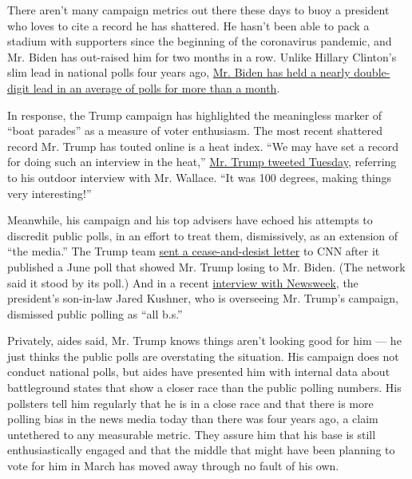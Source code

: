 There aren't many campaign metrics out there these days to buoy a
president who loves to cite a record he has shattered. He hasn't been
able to pack a stadium with supporters since the beginning of the
coronavirus pandemic, and Mr. Biden has out-raised him for two months in
a row. Unlike Hillary Clinton's slim lead in national polls four years
ago,
\href{https://www.nytimes.com/2020/07/20/upshot/biden-trump-poll.html?smid=tw-share}{Mr.
Biden has held a nearly double-digit lead in an average of polls for
more than a month}.

In response, the Trump campaign has highlighted the meaningless marker
of ``boat parades'' as a measure of voter enthusiasm. The most recent
shattered record Mr. Trump has touted online is a heat index. ``We may
have set a record for doing such an interview in the heat,''
\href{https://twitter.com/realDonaldTrump/status/1285520211593105413}{Mr.
Trump tweeted Tuesday}, referring to his outdoor interview with Mr.
Wallace. ``It was 100 degrees, making things very interesting!''

Meanwhile, his campaign and his top advisers have echoed his attempts to
discredit public polls, in an effort to treat them, dismissively, as an
extension of ``the media.'' The Trump team
\href{https://www.cnn.com/2020/06/10/politics/trump-campaign-cnn-poll/index.html}{sent
a cease-and-desist letter} to CNN after it published a June poll that
showed Mr. Trump losing to Mr. Biden. (The network said it stood by its
poll.) And in a recent
\href{https://www.newsweek.com/2020/07/24/exclusive-jared-kushner-gets-candid-about-struggling-trump-campaign-mideast-peace-more-1518952.html}{interview
with Newsweek}, the president's son-in-law Jared Kushner, who is
overseeing Mr. Trump's campaign, dismissed public polling as ``all
b.s.''

Privately, aides said, Mr. Trump knows things aren't looking good for
him --- he just thinks the public polls are overstating the situation.
His campaign does not conduct national polls, but aides have presented
him with internal data about battleground states that show a closer race
than the public polling numbers. His pollsters tell him regularly that
he is in a close race and that there is more polling bias in the news
media today than there was four years ago, a claim untethered to any
measurable metric. They assure him that his base is still
enthusiastically engaged and that the middle that might have been
planning to vote for him in March has moved away through no fault of his
own.

